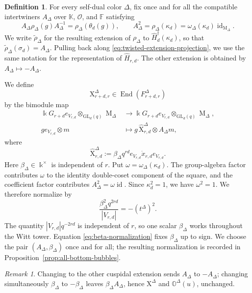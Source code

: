 \documentclass[12pt]{amsart}
\numberwithin{itemcounter}{subsection}
\theoremstyle{plain}
\theoremstyle{definition}
\newtheorem{definition}[theorem]{Definition}
\theoremstyle{remark}
\newtheorem{remark}[theorem]{Remark}
\numberwithin{equation}{section}
\def\bbO{\mathbb{O}}
\def\k{\Bbbk}
\def\GL{\mathrm{GL}}
\def\M{{\operatorname{M}\nolimits}}
\def\End{\operatorname{End}\nolimits}
\def\id{\operatorname{id}\nolimits}
\def\End{{\operatorname{End}}}
\DeclareMathOperator*{\ot}{\otimes}
\begin{document}
\begin{definition}\label{def:cuspidal-extension}
For every self-dual color $\Delta$, fix once and for all the compatible
intertwiners $A_\Delta$ over $\mathbb K$, $\mathcal O$, and $\mathbb F$
satisfying
\begin{equation*}
 A_\Delta\rho_\Delta(g)A_\Delta^{-1}
 =\rho_\Delta(\theta_d(g)),\qquad
 A_\Delta^2=\rho_\Delta(\kappa_d)
 =\omega_\Delta(\kappa_d)\id_{\M_\Delta}.
\end{equation*}
We write $\widetilde\rho_\Delta$ for the resulting extension of
$\rho_\Delta$ to $\widehat H_d^{\dagger}(\kappa_d)$, so that
$\widetilde\rho_\Delta(\sigma_d)=A_\Delta$.  Pulling back along
\eqref{eq:twisted-extension-projection}, we use the same notation for the
representation of $\widehat H_{r,d}$.  The other extension is obtained by
$A_\Delta\mapsto-A_\Delta$.
\end{definition}

We define
\[
\mathrm{X}^{\Delta}_{r+d,r}\in\End(F^{\Delta}_{r+d,r})
\]
by the bimodule map
\[
\begin{aligned}
\k G_{r+d}e_{V_{r,d}}\ot_{\GL_d(q)}\M_\Delta
&\longrightarrow
\k G_{r+d}e_{V_{r,d}}\ot_{\GL_d(q)}\M_\Delta,\\
ge_{V_{r,d}}\otimes m
&\longmapsto
 g\,\widehat{\mathrm{X}}^\Delta_{r,d}\otimes A_\Delta m,
\end{aligned}
\]
where
\begin{equation*}
 \widehat{\mathrm{X}}^\Delta_{r,d}
 :=\beta_\Delta q^{rd}e_{V_{r,d}}\dot x_{r,d}e_{V_{r,d}}.
\end{equation*}
Here $\beta_\Delta\in\k^\times$ is independent of $r$.  Put
$\omega=\omega_\Delta(\kappa_d)$.  The group-algebra factor contributes
$\omega$ to the identity double-coset component of the square, and the
coefficient factor contributes $A_\Delta^2=\omega\id$.
Since $\kappa_d^2=1$, we have $\omega^2=1$.  We therefore normalize by
\begin{equation}\label{eq:beta-normalization}
 \frac{\beta_\Delta^2q^{2rd}}{|V_{r,d}|}=-(t^\Delta)^2.
\end{equation}
The quantity $|V_{r,d}|q^{-2rd}$ is independent of $r$, so one scalar
$\beta_\Delta$ works throughout the Witt tower.  Equation
\eqref{eq:beta-normalization} fixes $\beta_\Delta$ up to sign.  We choose
the pair $(A_\Delta,\beta_\Delta)$ once and for all; the resulting
normalization is recorded in Proposition~\ref{prop:all-bottom-bubbles}.

\begin{remark}
\label{lem:extension-sign-independence}
Changing to the other cuspidal extension sends $A_\Delta$ to $-A_\Delta$;
changing simultaneously $\beta_\Delta$ to $-\beta_\Delta$ leaves
$\beta_\Delta A_\Delta$, hence $\mathrm{X}^\Delta$ and $\bbO^\Delta(u)$, unchanged.
\end{remark}
\end{document}
